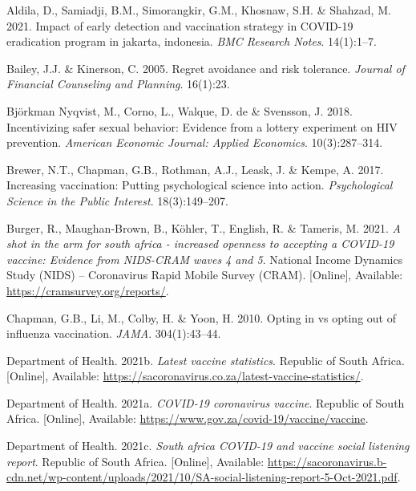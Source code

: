 \documentclass[11pt,preprint, authoryear]{elsarticle}
\numberwithin{equation}{section}
\numberwithin{figure}{section}
\numberwithin{table}{section}
\newlength{\cslhangindent}
\newenvironment{CSLReferences}%
  {\setlength{\parindent}{0pt}%
  \everypar{\setlength{\hangindent}{\cslhangindent}}\ignorespaces}%
  {\par}
\begin{document}
\hypertarget{refs}{}
\begin{CSLReferences}{1}{0}
\leavevmode\hypertarget{ref-erad}{}%
Aldila, D., Samiadji, B.M., Simorangkir, G.M., Khosnaw, S.H. \& Shahzad,
M. 2021. Impact of early detection and vaccination strategy in COVID-19
eradication program in jakarta, indonesia. \emph{BMC Research Notes}.
14(1):1--7.

\leavevmode\hypertarget{ref-regret}{}%
Bailey, J.J. \& Kinerson, C. 2005. Regret avoidance and risk tolerance.
\emph{Journal of Financial Counseling and Planning}. 16(1):23.

\leavevmode\hypertarget{ref-hiv}{}%
Björkman Nyqvist, M., Corno, L., Walque, D. de \& Svensson, J. 2018.
Incentivizing safer sexual behavior: Evidence from a lottery experiment
on HIV prevention. \emph{American Economic Journal: Applied Economics}.
10(3):287--314.

\leavevmode\hypertarget{ref-decide}{}%
Brewer, N.T., Chapman, G.B., Rothman, A.J., Leask, J. \& Kempe, A. 2017.
Increasing vaccination: Putting psychological science into action.
\emph{Psychological Science in the Public Interest}. 18(3):149--207.

\leavevmode\hypertarget{ref-cram}{}%
Burger, R., Maughan-Brown, B., Köhler, T., English, R. \& Tameris, M.
2021. \emph{A shot in the arm for south africa - increased openness to
accepting a COVID-19 vaccine: Evidence from NIDS-CRAM waves 4 and 5}.
National Income Dynamics Study (NIDS) -- Coronavirus Rapid Mobile Survey
(CRAM). {[}Online{]}, Available: \url{https://cramsurvey.org/reports/}.

\leavevmode\hypertarget{ref-opt}{}%
Chapman, G.B., Li, M., Colby, H. \& Yoon, H. 2010. Opting in vs opting
out of influenza vaccination. \emph{JAMA}. 304(1):43--44.

\leavevmode\hypertarget{ref-stat}{}%
Department of Health. 2021b. \emph{Latest vaccine statistics}. Republic
of South Africa. {[}Online{]}, Available:
\url{https://sacoronavirus.co.za/latest-vaccine-statistics/}.

\leavevmode\hypertarget{ref-herd}{}%
Department of Health. 2021a. \emph{COVID-19 coronavirus vaccine}.
Republic of South Africa. {[}Online{]}, Available:
\url{https://www.gov.za/covid-19/vaccine/vaccine}.

\leavevmode\hypertarget{ref-report}{}%
Department of Health. 2021c. \emph{South africa COVID-19 and vaccine
social listening report}. Republic of South Africa. {[}Online{]},
Available:
\url{https://sacoronavirus.b-cdn.net/wp-content/uploads/2021/10/SA-social-listening-report-5-Oct-2021.pdf}.


\end{CSLReferences}
\end{document}
